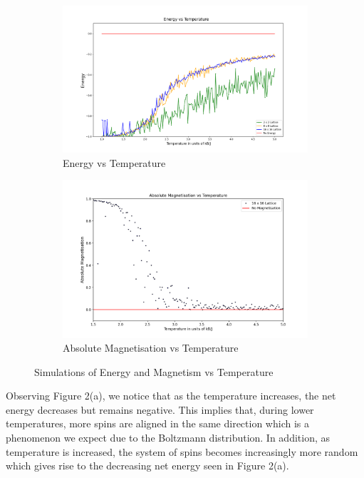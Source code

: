\documentclass[a4paper]{article}
\begin{document}
\begin{figure}[h]
\centering
\begin{subfigure}{0.5\textwidth}
\includegraphics[width=1\linewidth]{energy vs temp.png} 
\caption{Energy vs Temperature}
\label{fig:subim1}
\end{subfigure}
\begin{subfigure}{0.425\textwidth}
\includegraphics[width=1.1\linewidth,left]{mag vs temp.png}
\caption{Absolute Magnetisation vs Temperature}
\label{fig:subim2}
\end{subfigure}
\caption{Simulations of Energy and Magnetism vs Temperature}
\label{fig:image2}
\end{figure}

Observing Figure 2(a), we notice that as the temperature increases, the net energy decreases but remains negative. This implies that, during lower temperatures, more spins are aligned in the same direction which is a phenomenon we expect due to the Boltzmann distribution. In addition, as temperature is increased, the system of spins becomes increasingly more random which gives rise to the decreasing net energy seen in Figure 2(a).
\end{document}
